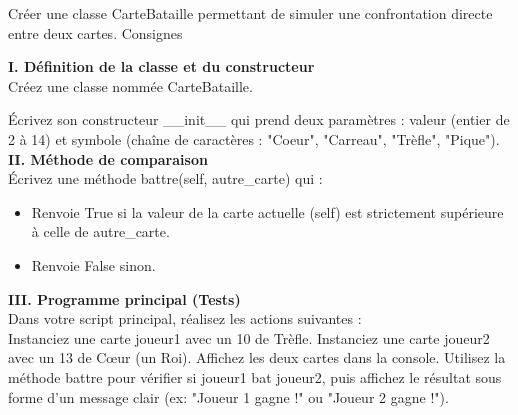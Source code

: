 


\begin{Exercise}[title=Exercice Préparatoire : La Classe CarteBataille]
\begin{Objectif}
    Créer une classe CarteBataille permettant de simuler une confrontation directe entre deux cartes.
Consignes
\end{Objectif}

\hspace{0.5cm}\textbf{I. Définition de la classe et du constructeur}\\ 

\Question  Créez une classe nommée CarteBataille.

\Question Écrivez son constructeur \_\_init\_\_ qui prend deux paramètres : valeur (entier de 2 à 14) et symbole (chaîne de caractères : "Coeur", "Carreau", "Trèfle", "Pique").\\

%
\textbf{II. Méthode de comparaison}\\

\Question Écrivez une méthode battre(self, autre\_carte) qui :
\begin{itemize}
\item Renvoie True si la valeur de la carte actuelle (self) est strictement supérieure à celle de autre\_carte.

    \item Renvoie False sinon.\\
\end{itemize}

%
\noindent\textbf{III. Programme principal (Tests)}\\
Dans votre script principal, réalisez les actions suivantes :\\
\Question Instanciez une carte joueur1 avec un 10 de Trèfle.
\Question Instanciez une carte joueur2 avec un 13 de Cœur (un Roi).
\Question Affichez les deux cartes dans la console.
\Question Utilisez la méthode battre pour vérifier si joueur1 bat joueur2, puis affichez le résultat sous forme d'un message clair (ex: "Joueur 1 gagne !" ou "Joueur 2 gagne !").
\end{Exercise}
